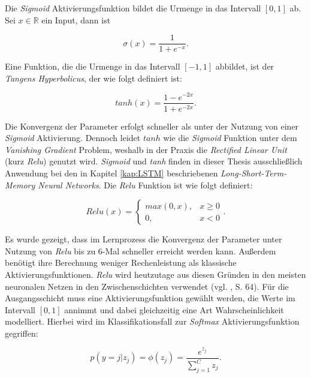 \documentclass[a4paper,11pt]{article}
\begin{document}
Die \textit{Sigmoid} Aktivierungsfunktion bildet die Urmenge in das Intervall $\left[0, 1\right]$ ab. Sei $x \in \mathbb{R}$ ein Input, dann ist 

\[\sigma(x) =  \frac{1}{1+ e^{-x}}.\]

Eine Funktion, die die Urmenge in das Intervall $\left[-1, 1\right]$ abbildet, ist der \textit{Tangens Hyperbolicus}, der wie folgt definiert ist:

\[tanh(x) =  \frac{1- e^{-2x}}{1+ e^{-2x}}.\]


Die Konvergenz der Parameter erfolgt schneller als unter der Nutzung von einer \textit{Sigmoid} Aktivierung. Dennoch leidet $tanh$ wie die \textit{Sigmoid} Funktion unter dem \textit{Vanishing Gradient} Problem, weshalb in der Praxis die \textit{Rectified Linear Unit} (kurz \textit{Relu}) genutzt wird. \textit{Sigmoid} und \textit{tanh} finden in dieser Thesis ausschließlich Anwendung bei den in Kapitel \ref{kap:LSTM} beschriebenen \textit{Long-Short-Term-Memory Neural Networks}. Die \textit{Relu} Funktion ist wie folgt definiert:

\[Relu(x) = 
\begin{cases}
max(0,x), & x \geq 0 \\
0, & x <0
\end{cases}{}
.\]

Es wurde gezeigt, dass im Lernprozess die Konvergenz der Parameter unter Nutzung von \textit{Relu} bis zu 6-Mal schneller erreicht werden kann. Außerdem benötigt ihre Berechnung weniger Rechenleistung als klassische Aktivierungsfunktionen. \textit{Relu} wird heutzutage aus diesen Gründen in den meisten neuronalen Netzen in den Zwischenschichten verwendet (vgl. \cite{deepEssentials}, S. 64). Für die Ausgangsschicht muss eine Aktivierungsfunktion gewählt werden, die Werte im Intervall $\left[0, 1\right]$ annimmt und dabei gleichzeitig eine Art Wahrscheinlichkeit modelliert. Hierbei wird im Klassifikationsfall zur \textit{Softmax} Aktivierungsfunktion gegriffen:

\[p(y = j |z_j) = \phi(z_j) = \frac{e^{z_j}}{\sum_{j=1}^C z_j} .\]
\end{document}
